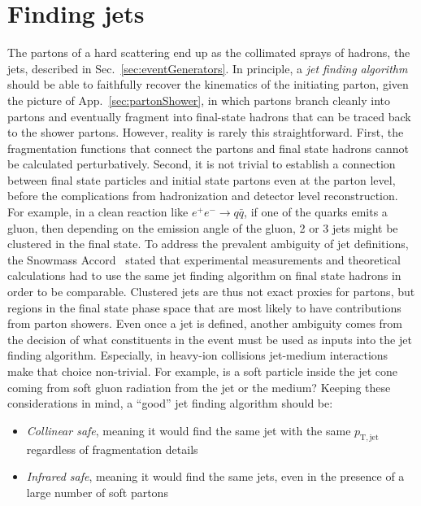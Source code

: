 \section{Finding jets}
\label{sec:jetAlgo}
The partons of a hard scattering end up as the collimated sprays of hadrons, the jets, described in Sec.~\ref{sec:eventGenerators}.
%
In principle, a \emph{jet finding algorithm} should be able to faithfully recover the kinematics of the initiating parton, given the picture of App.~\ref{sec:partonShower}, in which partons branch cleanly into partons and eventually fragment into final-state hadrons that can be traced back to the shower partons.
%
However, reality is rarely this straightforward.
%
First, the fragmentation functions that connect the partons and final state hadrons cannot be calculated perturbatively.
%
Second, it is not trivial to establish a connection between final state particles and initial state partons even at the parton level, before the complications from hadronization and detector level reconstruction.
%
For example, in a clean reaction like \(e^+e^-\to q\bar{q}\), if one of the quarks emits a gluon, then depending on the emission angle of the gluon, 2 or 3 jets might be clustered in the final state.
%
To address the prevalent ambiguity of jet definitions, the Snowmass Accord~\cite{Berger:1992etd} stated that experimental measurements and theoretical calculations had to use the same jet finding algorithm on final state hadrons in order to be comparable. 
%
Clustered jets are thus not exact proxies for partons, but regions in the final state phase space that are most likely to have contributions from parton showers. 
%
Even once a jet is defined, another ambiguity comes from the decision of what constituents in the event must be used as inputs into the jet finding algorithm. Especially, in heavy-ion collisions jet-medium interactions make that choice non-trivial. For example, is a soft particle inside the jet cone coming from soft gluon radiation from the jet or the medium? Keeping these considerations in mind, a ``good'' jet finding algorithm should be:
\begin{itemize}
	\item \emph{Collinear safe}, meaning it would find the same jet with the same \(p_\mathrm{T, jet}\) regardless of  fragmentation details
	\item \emph{Infrared safe}, meaning  it would find the same jets, even in the presence of a
	large number of soft partons
\end{itemize}

